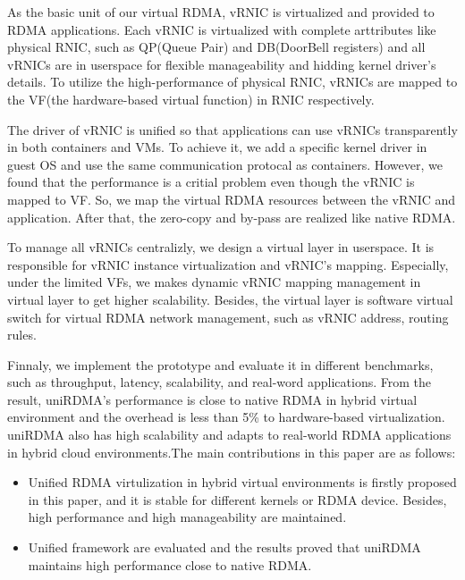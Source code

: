As the basic unit of our virtual RDMA, vRNIC is virtualized and provided to RDMA applications. Each vRNIC is virtualized with complete arttributes like physical RNIC, such as QP(Queue Pair) and DB(DoorBell registers) and all vRNICs are in userspace for flexible manageability and hidding kernel driver's details. To utilize the high-performance of physical RNIC, vRNICs are mapped to the VF(the hardware-based virtual function) in RNIC respectively. 

The driver of vRNIC is unified so that applications can use vRNICs transparently in both containers and VMs. To achieve it, we add a specific kernel driver in guest OS and use the same communication protocal as containers. However, we found that the performance is a critial problem even though the vRNIC is mapped to VF. So, we map the virtual RDMA resources between the vRNIC and application. After that, the zero-copy and by-pass are realized like native RDMA.

To manage all vRNICs centralizly, we design a virtual layer in userspace. It is responsible for vRNIC instance virtualization and vRNIC's mapping. Especially, under the limited VFs, we makes dynamic vRNIC mapping management in virtual layer to get higher scalability. Besides, the virtual layer is software virtual switch for virtual RDMA network management, such as vRNIC address, routing rules.

Finnaly, we implement the prototype and evaluate it in different benchmarks, such as throughput, latency, scalability, and real-word applications. From the result, uniRDMA's performance is close to native RDMA in hybrid virtual environment and the overhead is less than 5\% to hardware-based virtualization. uniRDMA also has high scalability and adapts to real-world RDMA applications in hybrid cloud environments.The main contributions in this paper are as follows:

\begin{itemize}
\item Unified RDMA virtulization in hybrid virtual environments is firstly proposed in this paper, and it is stable for different kernels or RDMA device. Besides, high performance and high manageability are maintained.

\item Unified framework are evaluated and the results proved that uniRDMA maintains high performance close to native RDMA.
\end{itemize}
